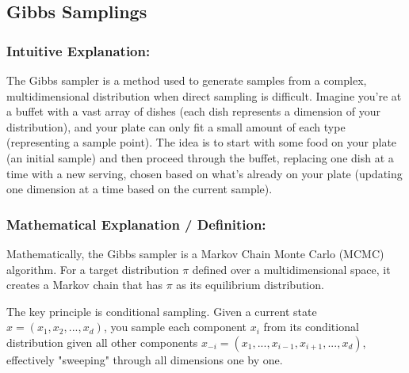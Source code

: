 \documentclass{article}
\begin{document}
\subsection{Gibbs Samplings}


\subsubsection{Intuitive Explanation:}

The Gibbs sampler is a method used to generate samples from a complex, multidimensional distribution when direct sampling is difficult. Imagine you're at a buffet with a vast array of dishes (each dish represents a dimension of your distribution), and your plate can only fit a small amount of each type (representing a sample point). The idea is to start with some food on your plate (an initial sample) and then proceed through the buffet, replacing one dish at a time with a new serving, chosen based on what's already on your plate (updating one dimension at a time based on the current sample).

\subsubsection{Mathematical Explanation / Definition:}

Mathematically, the Gibbs sampler is a Markov Chain Monte Carlo (MCMC) algorithm. For a target distribution \( \pi \) defined over a multidimensional space, it creates a Markov chain that has \( \pi \) as its equilibrium distribution. 

The key principle is conditional sampling. Given a current state \( x = (x_1, x_2, ..., x_d) \), you sample each component \( x_i \) from its conditional distribution given all other components \( x_{-i} = (x_1, ..., x_{i-1}, x_{i+1}, ..., x_d) \), effectively "sweeping" through all dimensions one by one.
\end{document}

